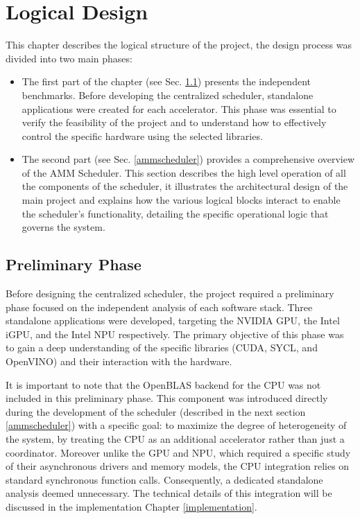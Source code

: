 \chapter{Logical Design}
\label{logical design}

This chapter describes the logical structure of the project, the design process was divided into two main phases:

\begin{itemize}
    \item The first part of the chapter (see Sec. \ref{preliminary}) presents the independent benchmarks. Before developing the centralized scheduler, standalone applications were created for each accelerator. This phase was essential to verify the feasibility of the project and to understand how to effectively control the specific hardware using the selected libraries. 

    \item  The second part (see Sec. \ref{ammscheduler}) provides a comprehensive overview of the AMM Scheduler. This section describes the high level operation of all the components of the scheduler, it illustrates the architectural design of the main project and explains how the various logical blocks interact to enable the scheduler's functionality, detailing the specific operational logic that governs the system.
\end{itemize}

\clearpage

\section{Preliminary Phase}
\label{preliminary}
Before designing the centralized scheduler, the project required a preliminary phase focused on the independent analysis of each software stack. Three standalone applications were developed, targeting the NVIDIA GPU, the Intel iGPU, and the Intel NPU respectively. The primary objective of this phase was to gain a deep understanding of the specific libraries (CUDA, SYCL, and OpenVINO) and their interaction with the hardware.

It is important to note that the OpenBLAS backend for the CPU was not included in this preliminary phase. This component was introduced directly during the development of the scheduler (described in the next section \ref{ammscheduler}) with a specific goal: to maximize the degree of heterogeneity of the system, by treating the CPU as an additional accelerator rather than just a coordinator. Moreover unlike the GPU and NPU, which required a specific study of their asynchronous drivers and memory models, the CPU integration relies on standard synchronous function calls. Consequently, a dedicated standalone analysis deemed unnecessary. The technical details of this integration will be discussed in the implementation Chapter \ref{implementation}.

